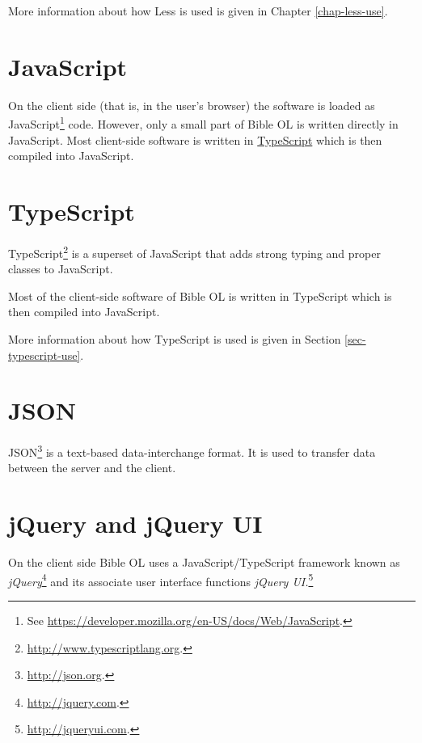 \documentclass[11pt,oneside,a4paper]{memoir}
\begin{document}
More information about how Less is used is given in Chapter \ref{chap-less-use}.

\section{JavaScript}\label{javascript}

On the client side (that is, in the user's browser) the software is loaded as
JavaScript\footnote{See \url{https://developer.mozilla.org/en-US/docs/Web/JavaScript}.} code.
However, only a small part of Bible OL is written directly in JavaScript. Most client-side software
is written in \hyperref[sec-typescript]{TypeScript} which is then compiled into JavaScript.

\section{TypeScript}\label{sec-typescript}

TypeScript\footnote{\url{http://www.typescriptlang.org}.} is a superset of JavaScript that adds
strong typing and proper classes to JavaScript.

Most of the client-side software of Bible OL is written in TypeScript which is then compiled into
JavaScript.

More information about how TypeScript is used is given in Section
\ref{sec-typescript-use}.

\section{JSON}

JSON\footnote{\url{http://json.org}.} is a text-based data-interchange format. It is used to
transfer data between the server and the client.

\section{jQuery and jQuery UI}

On the client side Bible OL uses a JavaScript/TypeScript framework known as
\emph{jQuery}\footnote{\url{http://jquery.com}.} and its associate user interface functions
\emph{jQuery UI.}\footnote{\url{http://jqueryui.com}.}

\end{document}
